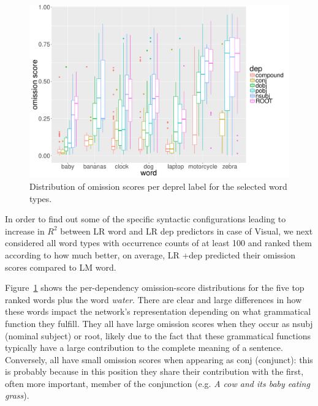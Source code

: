 \begin{figure}[t]
  \centering
  \includegraphics[scale=0.35]{top_words.pdf}
  \caption{Distribution of omission scores per deprel label for the selected word types.}
  \label{fig:top_words}
\end{figure}

In order to find out some of the specific syntactic configurations leading to
increase in $R^2$ between {\sc LR word} and {\sc LR dep} predictors
in case of {\sc Visual}, we next considered all word types with
occurrence counts of at least 100 and ranked them according to how much
better, on average, {\sc LR +dep} predicted their omission scores 
compared to {\sc LM word}. 

Figure~\ref{fig:top_words} shows the per-dependency 
omission-score distributions for the five top ranked words plus the word {\it  water}. 
There are clear and large differences in how these words
impact the network's representation depending on what grammatical
function they fulfill. They all have large omission scores when they
occur as {\sc nsubj} (nominal subject) or {\sc root}, likely due to the fact that these
grammatical functions typically have a large contribution to the
complete meaning of a sentence.  Conversely, all have small omission 
scores when appearing as {\sc conj} (conjunct): this is probably because in this position
they share their contribution with the first, often more important,
member of the conjunction (e.g. {\it A cow and its baby eating
  grass}). 
  
